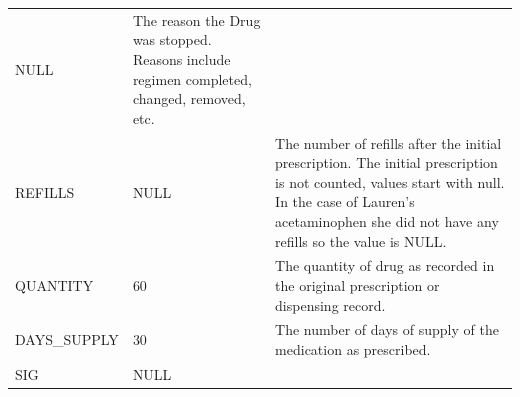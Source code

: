 \documentclass[]{book}
\begin{document}
\begin{longtable}[]{@{}lll@{}}
\begin{minipage}[t]{0.14\columnwidth}
NULL\strut
\end{minipage} & \begin{minipage}[t]{0.47\columnwidth}\raggedright\strut
The reason the Drug was stopped. Reasons include regimen completed,
changed, removed, etc.\strut
\end{minipage}\tabularnewline
\begin{minipage}[t]{0.30\columnwidth}\raggedright\strut
REFILLS\strut
\end{minipage} & \begin{minipage}[t]{0.14\columnwidth}\raggedright\strut
NULL\strut
\end{minipage} & \begin{minipage}[t]{0.47\columnwidth}\raggedright\strut
The number of refills after the initial prescription. The initial
prescription is not counted, values start with null. In the case of
Lauren's acetaminophen she did not have any refills so the value is
NULL.\strut
\end{minipage}\tabularnewline
\begin{minipage}[t]{0.30\columnwidth}\raggedright\strut
QUANTITY\strut
\end{minipage} & \begin{minipage}[t]{0.14\columnwidth}\raggedright\strut
60\strut
\end{minipage} & \begin{minipage}[t]{0.47\columnwidth}\raggedright\strut
The quantity of drug as recorded in the original prescription or
dispensing record.\strut
\end{minipage}\tabularnewline
\begin{minipage}[t]{0.30\columnwidth}\raggedright\strut
DAYS\_SUPPLY\strut
\end{minipage} & \begin{minipage}[t]{0.14\columnwidth}\raggedright\strut
30\strut
\end{minipage} & \begin{minipage}[t]{0.47\columnwidth}\raggedright\strut
The number of days of supply of the medication as prescribed.\strut
\end{minipage}\tabularnewline
\begin{minipage}[t]{0.30\columnwidth}\raggedright\strut
SIG\strut
\end{minipage} & \begin{minipage}[t]{0.14\columnwidth}\raggedright\strut
NULL\strut
\end{minipage} & \begin{minipage}[t]{0.47\columnwidth}\raggedright\strut

\end{minipage}
\end{longtable}
\end{document}
